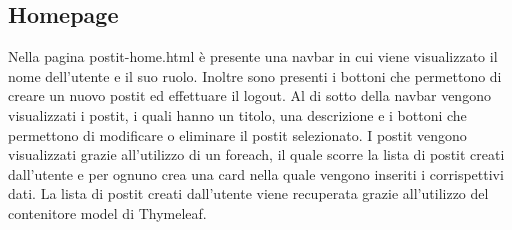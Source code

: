 \subsection{Homepage}
Nella pagina postit-home.html è presente una navbar in cui viene visualizzato il nome dell'utente e il suo ruolo. Inoltre sono presenti i bottoni che permettono di creare un nuovo postit ed effettuare il logout.
Al di sotto della navbar vengono visualizzati i postit, i quali hanno un titolo, una descrizione e i bottoni che permettono di modificare o eliminare il postit selezionato.
I postit vengono visualizzati grazie all'utilizzo di un foreach, il quale scorre la lista di postit creati dall'utente e per ognuno crea una card nella quale vengono inseriti i corrispettivi dati.
La lista di postit creati dall'utente viene recuperata grazie all'utilizzo del contenitore model di Thymeleaf.
